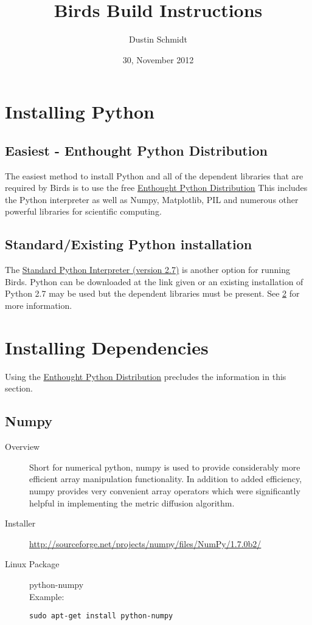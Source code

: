 \documentclass[a4paper,10pt]{article}
\title{Birds Build Instructions}
\author{Dustin Schmidt}
\date{30, November 2012}
\begin{document}
\maketitle

\section{Installing Python}
\subsection[short]{Easiest - Enthought Python Distribution}
The easiest method to install Python and all of the dependent libraries that are required by Birds is to use the free \href{http://epd-free.enthought.com/?Download=Download+EPD+Free+7.3-2}{Enthought Python Distribution}  This includes the Python interpreter as well as Numpy, Matplotlib, PIL and numerous other powerful libraries for scientific computing.
\subsection[short]{Standard/Existing Python installation} The \href{http://python.org/download/}{Standard Python Interpreter (version 2.7)} is another option for running Birds.  Python can be downloaded at the link given or an existing installation of Python 2.7 may be used but the dependent libraries must be present.  See \ref{sec:dep} for more information.

\section{Installing Dependencies}\label{sec:dep}
Using the \href{http://epd-free.enthought.com/?Download=Download+EPD+Free+7.3-2}{Enthought Python Distribution} precludes the information in this section.
\subsection{Numpy}
\begin{description}
 \item [Overview] Short for numerical python, numpy is used to provide considerably more efficient array manipulation functionality.  In addition to added efficiency, numpy provides very convenient array operators which were significantly helpful in implementing the metric diffusion algorithm.
 \item[Installer] \url{http://sourceforge.net/projects/numpy/files/NumPy/1.7.0b2/}
 \item[Linux Package] python-numpy \\ Example: \begin{verbatim}sudo apt-get install python-numpy\end{verbatim}
 \end{description}
\end{document}
